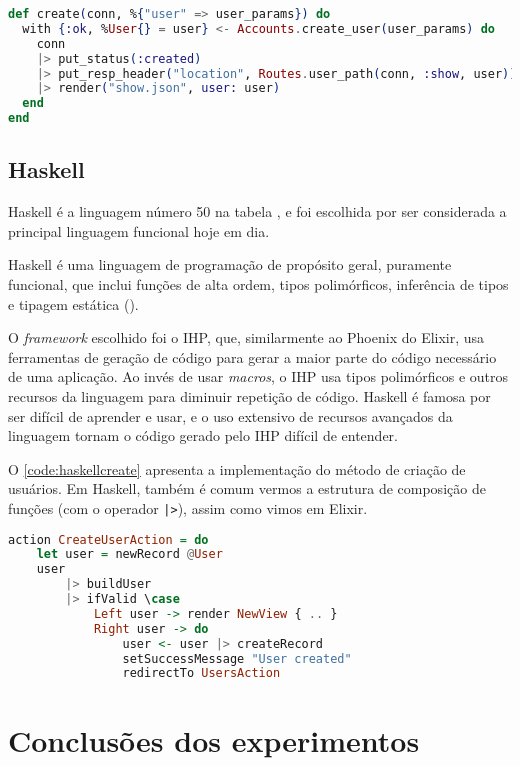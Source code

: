 \begin{lstlisting}[language=Elixir,label={code:elixircreate},caption={Função de criação de usuário em Elixir com Phoenix}]
def create(conn, %{"user" => user_params}) do
  with {:ok, %User{} = user} <- Accounts.create_user(user_params) do
    conn
    |> put_status(:created)
    |> put_resp_header("location", Routes.user_path(conn, :show, user))
    |> render("show.json", user: user)
  end
end
\end{lstlisting}

\subsection{Haskell}\label{subsec:haskell}

Haskell é a linguagem número 50 na tabela \textcite{tiobeindex}, e foi escolhida
por ser considerada a principal linguagem funcional hoje em dia.

Haskell é uma linguagem de programação de propósito geral, puramente funcional,
que inclui funções de alta ordem, tipos polimórficos, inferência de tipos e
tipagem estática (\textcite{conceptionoffunctionalpl}).

O \textit{framework} escolhido foi o IHP, que, similarmente ao Phoenix do Elixir,
usa ferramentas de geração de código para gerar a maior parte do código necessário
de uma aplicação. Ao invés de usar \textit{macros}, o IHP usa tipos polimórficos
e outros recursos da linguagem para diminuir repetição de código. Haskell é
famosa por ser difícil de aprender e usar, e o uso extensivo de recursos avançados
da linguagem tornam o código gerado pelo IHP difícil de entender.

O \autoref{code:haskellcreate} apresenta a implementação do método de criação de
usuários. Em Haskell, também é comum vermos a estrutura de composição de funções
(com o operador \texttt{|>}), assim como vimos em Elixir.

\begin{lstlisting}[language=Haskell,label={code:haskellcreate},caption={Função de criação de usuário em Haskell com IHP}]
action CreateUserAction = do
    let user = newRecord @User
    user
        |> buildUser
        |> ifValid \case
            Left user -> render NewView { .. } 
            Right user -> do
                user <- user |> createRecord
                setSuccessMessage "User created"
                redirectTo UsersAction
\end{lstlisting}

\section{Conclusões dos experimentos}

